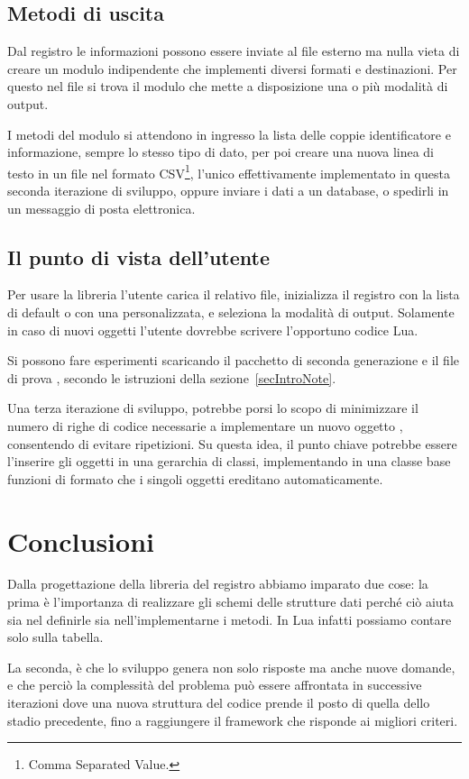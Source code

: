 \subsection{Metodi di uscita}

Dal registro le informazioni possono essere inviate al file esterno ma nulla
vieta di creare un modulo indipendente che implementi diversi formati e
destinazioni. Per questo nel file  si trova il modulo
 che mette a disposizione una o più modalità di output.

I metodi del modulo si attendono in ingresso la lista delle coppie
identificatore e informazione, sempre lo stesso tipo di dato, per poi creare una
nuova linea di testo in un file nel formato CSV\footnote{Comma Separated
Value.}, l'unico effettivamente implementato in questa seconda iterazione di
sviluppo, oppure inviare i dati a un database, o spedirli in un messaggio di
posta elettronica.


\subsection{Il punto di vista dell'utente}

Per usare la libreria l'utente carica il relativo file, inizializza il registro
con la lista di default o con una personalizzata, e seleziona la modalità di
output. Solamente in caso di nuovi oggetti  l'utente dovrebbe scrivere
l'opportuno codice Lua.

Si possono fare esperimenti scaricando il pacchetto di seconda generazione
 e il file di prova ,
secondo le istruzioni della sezione~\ref{secIntroNote}.

Una terza iterazione di sviluppo, potrebbe porsi lo scopo di minimizzare il
numero di righe di codice necessarie a implementare un nuovo oggetto ,
consentendo di evitare ripetizioni. Su questa idea, il punto chiave potrebbe
essere l'inserire gli oggetti  in una gerarchia di classi,
implementando in una classe base funzioni di formato che i singoli oggetti
ereditano automaticamente.


\section{Conclusioni}

Dalla progettazione della libreria del registro abbiamo imparato due cose: la
prima è l'importanza di realizzare gli schemi delle strutture dati perché ciò
aiuta sia nel definirle sia nell'implementarne i metodi. In Lua infatti possiamo
contare solo sulla tabella.

La seconda, è che lo sviluppo genera non solo risposte ma anche nuove domande, e
che perciò la complessità del problema può essere affrontata in successive
iterazioni dove una nuova struttura del codice prende il posto di quella dello
stadio precedente, fino a raggiungere il framework che risponde ai migliori
criteri.


